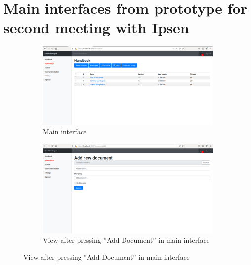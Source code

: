 \section{Main interfaces from prototype for second meeting with Ipsen}\label{sec:1prototype}
\begin{figure}[H]
	\centering
	\begin{subfigure}[b]{0.48\textwidth}
		\includegraphics[width=\textwidth]{billeder/iteration1Prototyper/Handbook.png}
		\caption{Main interface}
		\label{fig:3-main}
	\end{subfigure}
	\quad
	\begin{subfigure}[b]{0.48\textwidth}
		\includegraphics[width=\textwidth]{billeder/iteration1Prototyper/Add-Document.png}
		\caption{View after pressing ''Add Document'' in main interface}
		\label{fig:3-addDoc}
	\end{subfigure}
\end{figure}
